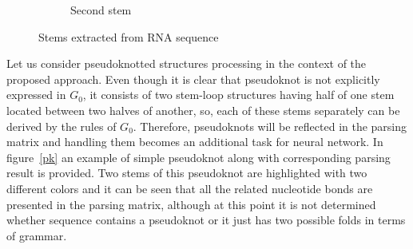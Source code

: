 \documentclass[runningheads]{llncs}
\begin{document}
\begin{figure}
{{\begin{subfigure}{.4\textwidth}
    \caption{Second stem}
    \label{stem2}
    \end{subfigure}%
  }\cr
}
\caption{Stems extracted from RNA sequence}
\label{pars_res}
\end{figure}

Let us consider pseudoknotted structures processing in the context of the proposed approach. Even though it is clear that pseudoknot is not explicitly expressed in $G_0$, it consists of two stem-loop structures having half of one stem located between two halves of another, so, each of these stems separately can be derived by the rules of $G_0$. Therefore, pseudoknots will be reflected in the parsing matrix and handling them becomes an additional task for neural network. In figure~\ref{pk} an example of simple pseudoknot along with corresponding parsing result is provided. Two stems of this pseudoknot are highlighted with two different colors and it can be seen that all the related nucleotide bonds are presented in the parsing matrix, although at this point it is not determined whether sequence contains a pseudoknot or it just has two possible folds in terms of grammar.
\end{document}
